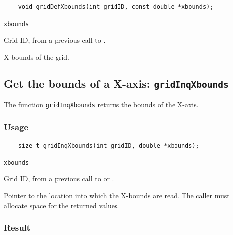 \begin{verbatim}
    void gridDefXbounds(int gridID, const double *xbounds);
\end{verbatim}

\hspace*{4mm}\begin{minipage}[]{15cm}
\begin{deflist}{\texttt{xbounds}\ }
\item[\texttt{gridID}]
Grid ID, from a previous call to {}.
\item[\texttt{xbounds}]
X-bounds of the grid.

\end{deflist}
\end{minipage}


\subsection{Get the bounds of a X-axis: \texttt{gridInqXbounds}}
\label{gridInqXbounds}

The function {\texttt{gridInqXbounds}} returns the bounds of the X-axis.

\subsubsection*{Usage}

\begin{verbatim}
    size_t gridInqXbounds(int gridID, double *xbounds);
\end{verbatim}

\hspace*{4mm}\begin{minipage}[]{15cm}
\begin{deflist}{\texttt{xbounds}\ }
\item[\texttt{gridID}]
Grid ID, from a previous call to {} or {}.
\item[\texttt{xbounds}]
Pointer to the location into which the X-bounds are read.
                    The caller must allocate space for the returned values.

\end{deflist}
\end{minipage}

\subsubsection*{Result}

